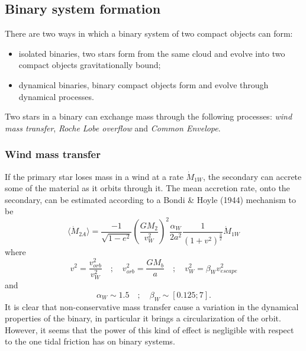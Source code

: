 \documentclass[prb,twocolumn,9pt]{revtex4-1}
\begin{document}
\subsection{Binary system formation}
There are two ways in which a binary system of two compact objects can form: 
\begin{itemize}
    \item isolated binaries, two stars form from the same cloud and evolve into two compact objects gravitationally bound;
    \item dynamical binaries, binary compact objects form and evolve through dynamical processes.
\end{itemize}

Two stars in a binary can exchange mass through the following processes: \textit{wind mass transfer}, \textit{Roche Lobe overflow} and \textit{Common Envelope}.

\subsubsection{Wind mass transfer}
If the primary star loses mass in a wind at a rate \(\dot M_{1W}\), the secondary can accrete some of the material as it orbits through it.
The mean accretion rate, onto the secondary, can be estimated according to a Bondi \& Hoyle (1944) mechanism to be
\begin{equation}
    \langle \dot M_{2A} \rangle = \frac{-1}{\sqrt{1-e^2}}\left (\frac{GM_2}{v_W^2}\right )^2\frac{\alpha_W}{2a^2}\frac{1}{(1+v^2)^{\frac{3}{2}}}\dot M_{1W}
\end{equation}
where
\begin{equation}
    v^2 = \frac{v_{orb}^2}{v_W^2} \quad ; \quad v_{orb}^2 = \frac{GM_b}{a} \quad ; \quad     v_W^2 = \beta_Wv_{escape}^2
    \nonumber
\end{equation}
and 
\begin{equation}
    \alpha_W \sim 1.5 \quad ; \quad \beta_W \sim [0.125;7].
    \nonumber
\end{equation}
It is clear that non-conservative mass transfer cause a variation in the dynamical properties of the binary, in particular it brings a circularization of the orbit. However, it seems that the power of this kind of effect is negligible with respect to the one tidal friction has on binary systems. 
\end{document}
